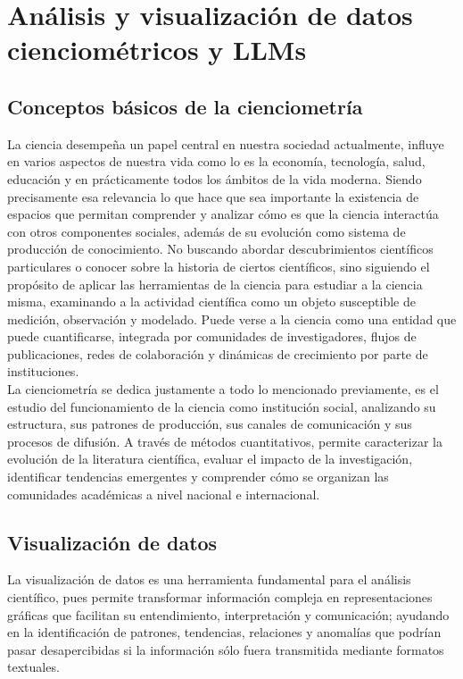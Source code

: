 \documentclass[letterpaper,spanish,12pt]{book}
\begin{document}
\chapter{Análisis y visualización de datos cienciométricos y LLMs}

    \section{Conceptos básicos de la cienciometría}

    La ciencia desempeña un papel central en nuestra sociedad actualmente, influye en varios aspectos de nuestra vida como lo es la economía, tecnología, salud, educación y en prácticamente todos los ámbitos de la vida moderna. Siendo precisamente esa relevancia lo que hace que sea importante la existencia de espacios que permitan comprender y analizar cómo es que la ciencia interactúa con otros componentes sociales, además de su evolución como sistema de producción de conocimiento. No buscando abordar descubrimientos científicos particulares o conocer sobre la historia de ciertos científicos, sino siguiendo el propósito de aplicar las herramientas de la ciencia para estudiar a la ciencia misma, examinando a la actividad científica como un objeto susceptible de medición, observación y modelado. Puede verse a la ciencia como una entidad que puede cuantificarse, integrada por comunidades de investigadores, flujos de publicaciones, redes de colaboración y dinámicas de crecimiento por parte de instituciones. \\
    
    La cienciometría se dedica justamente a todo lo mencionado previamente, es el estudio del funcionamiento de la ciencia como institución social, analizando su estructura, sus patrones de producción, sus canales de comunicación y sus procesos de difusión. A través de métodos cuantitativos, permite caracterizar la evolución de la literatura científica, evaluar el impacto de la investigación, identificar tendencias emergentes y comprender cómo se organizan las comunidades académicas a nivel nacional e internacional.

    

    \newpage
    
    \section{Visualización de datos}

    La visualización de datos es una herramienta fundamental para el análisis científico, pues permite transformar información compleja en representaciones gráficas que facilitan su entendimiento, interpretación y comunicación; ayudando en la identificación de patrones, tendencias, relaciones y anomalías que podrían pasar desapercibidas si la información sólo fuera transmitida mediante formatos textuales. \\
\end{document}
